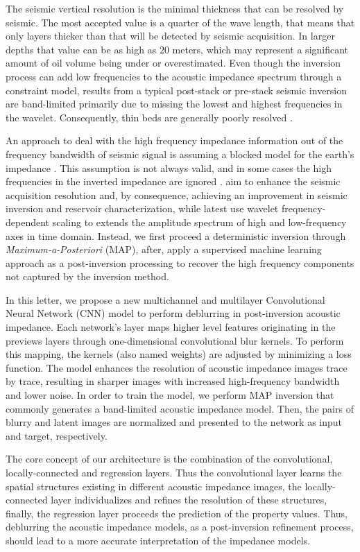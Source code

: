 \documentclass[journal]{IEEEtran}
\begin{document}
The seismic vertical resolution is the minimal thickness that
can be resolved by seismic. The most accepted value is a quarter
of the wave length, that means that only layers thicker than
that will be detected by seismic acquisition. In larger depths
that value can be as high as $20$ meters, which may represent a
significant amount of oil volume being under or overestimated.
Even though the inversion
process can add low frequencies to the acoustic impedance
spectrum through a constraint model, results from a typical
post-stack or pre-stack seismic inversion are band-limited
primarily due to missing the lowest and highest frequencies in the
wavelet. Consequently, thin beds are generally poorly resolved
\cite{Zhang2012}. 

An approach to deal with the high frequency
impedance information out of the frequency bandwidth of seismic signal
is assuming a blocked model for the earth's impedance \cite{Cook2010}.
This assumption is not always valid, and in some cases the high
frequencies in the inverted impedance are ignored \cite{YuanWang2015}.
\cite{xiaoiu} aim to enhance the seismic acquisition resolution and, by
consequence, achieving an improvement in seismic inversion and
reservoir characterization, while \cite{ChenWang2018} latest use wavelet
frequency-dependent scaling to extends the amplitude spectrum of
high and low-frequency axes in time domain. Instead, we first
proceed a deterministic inversion through \textit{Maximum-a-Posteriori} (MAP),
after, apply a supervised machine learning approach as a post-inversion
processing to recover the high frequency components not captured by the inversion
method.

In this letter, we propose a new multichannel and multilayer
Convolutional Neural Network (CNN) model to perform deblurring
in post-inversion acoustic impedance. Each network's layer maps
higher level features originating in the previews layers through
one-dimensional convolutional blur kernels. To perform this
mapping, the kernels (also named weights) are adjusted by
minimizing a loss function. The model enhances the resolution
of acoustic impedance images trace by trace, resulting in sharper
images with increased high-frequency bandwidth and lower noise.
In order to train the model, we perform MAP
inversion that commonly generates a band-limited acoustic impedance model.
Then, the pairs of blurry and latent images are normalized and 
presented to the network as input and target, respectively.

The core concept of our architecture is the combination of the
convolutional, locally-connected and regression layers. Thus
the convolutional layer learns the spatial structures existing
in different acoustic impedance images, the locally-connected
layer individualizes and refines the resolution of these structures,
finally, the regression layer proceeds the prediction of the property values.
Thus, deblurring the acoustic impedance models, as a post-inversion
refinement process, should lead to a more accurate interpretation
of the impedance models.
\end{document}
